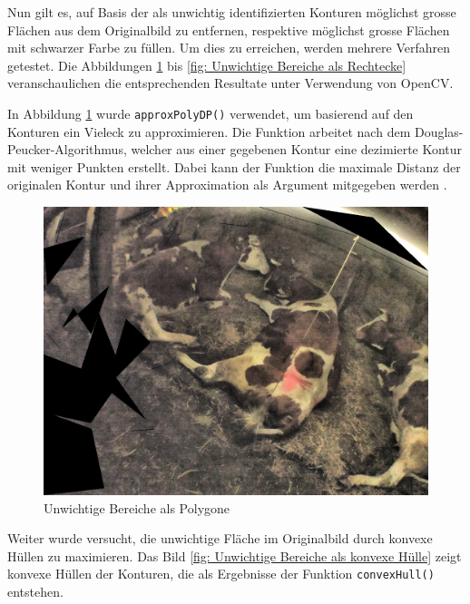 Nun gilt es, auf Basis der als unwichtig identifizierten Konturen möglichst grosse Flächen aus dem Originalbild zu entfernen, respektive möglichst grosse Flächen mit schwarzer Farbe zu füllen. Um dies zu erreichen, werden mehrere Verfahren getestet. Die Abbildungen  \ref{fig: Unwichtige Bereiche als Polygone} bis \ref{fig: Unwichtige Bereiche als Rechtecke} veranschaulichen die entsprechenden Resultate unter Verwendung von OpenCV. 

In Abbildung \ref{fig: Unwichtige Bereiche als Polygone} wurde \texttt{approxPolyDP()} verwendet, um basierend auf den Konturen ein Vieleck zu approximieren. Die Funktion arbeitet nach dem Douglas-Peucker-Algorithmus, welcher aus einer gegebenen Kontur eine dezimierte Kontur mit weniger Punkten erstellt. Dabei kann der Funktion die maximale Distanz der originalen Kontur und ihrer Approximation als Argument mitgegeben werden \citep[S. 383]{FernandezVillan2019}.  

\begin{figure}[H]
	\center
	\includegraphics[scale=0.43]{Grafiken/entwicklung/7unwichtigePolygone.jpg}
	\caption{Unwichtige Bereiche als Polygone } 
	\label{fig: Unwichtige Bereiche als Polygone}
\end{figure}

Weiter wurde versucht, die unwichtige Fläche im Originalbild durch konvexe Hüllen zu maximieren. Das Bild \ref{fig: Unwichtige Bereiche als konvexe Hülle} zeigt konvexe Hüllen der Konturen,  die als Ergebnisse der Funktion \texttt{convexHull()} entstehen.

